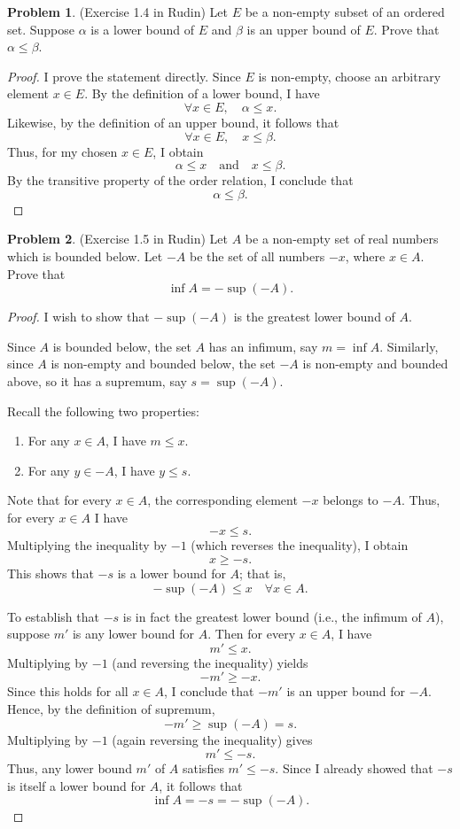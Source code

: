 \documentclass[12pt,oneside]{article}
\theoremstyle{definition}
\newtheorem{problem}{Problem}
\begin{document}
\newpage

\begin{problem}
(Exercise 1.4 in Rudin) 
Let $E$ be a non-empty subset of an ordered set. 
Suppose $\alpha$ is a lower bound of $E$ and $\beta$ is an upper bound of $E$. 
Prove that $\alpha \leq \beta$. 
\end{problem}

\begin{proof}
I prove the statement directly. Since \( E \) is non-empty, choose an arbitrary element \( x \in E \). By the definition of a lower bound, I have
\[
\forall x \in E, \quad \alpha \leq x.
\]
Likewise, by the definition of an upper bound, it follows that
\[
\forall x \in E, \quad x \leq \beta.
\]
Thus, for my chosen \( x \in E \), I obtain
\[
\alpha \leq x \quad \text{and} \quad x \leq \beta.
\]
By the transitive property of the order relation, I conclude that
\[
\alpha \leq \beta.
\]
\end{proof}

\newpage 

\begin{problem}
(Exercise 1.5 in Rudin)
Let $A$ be a non-empty set of real numbers which is bounded below. 
Let $-A$ be the set of all numbers $-x$, where $x\in A$. 
Prove that 
\[
\inf A = - \sup (-A).
\]
\end{problem}

\begin{proof}
I wish to show that \(-\sup(-A)\) is the greatest lower bound of \(A\).

Since \(A\) is bounded below, the set \(A\) has an infimum, say \(m = \inf A\). Similarly, since \(A\) is non-empty and bounded below, the set \(-A\) is non-empty and bounded above, so it has a supremum, say \(s = \sup(-A)\).

Recall the following two properties:
\begin{enumerate}
    \item For any \(x \in A\), I have \(m \le x\).
    \item For any \(y \in -A\), I have \(y \le s\).
\end{enumerate}

Note that for every \(x \in A\), the corresponding element \(-x\) belongs to \(-A\). Thus, for every \(x \in A\) I have
\[
-x \le s.
\]
Multiplying the inequality by \(-1\) (which reverses the inequality), I obtain
\[
x \ge -s.
\]
This shows that \(-s\) is a lower bound for \(A\); that is,
\[
- \sup(-A) \le x \quad \forall x \in A.
\]

To establish that \(-s\) is in fact the greatest lower bound (i.e., the infimum of \(A\)), suppose \(m'\) is any lower bound for \(A\). Then for every \(x \in A\), I have
\[
m' \le x.
\]
Multiplying by \(-1\) (and reversing the inequality) yields
\[
-m' \ge -x.
\]
Since this holds for all \(x \in A\), I conclude that \(-m'\) is an upper bound for \(-A\). Hence, by the definition of supremum,
\[
-m' \ge \sup(-A) = s.
\]
Multiplying by \(-1\) (again reversing the inequality) gives
\[
m' \le -s.
\]
Thus, any lower bound \(m'\) of \(A\) satisfies \(m' \le -s\). Since I already showed that \(-s\) is itself a lower bound for \(A\), it follows that
\[
\inf A = -s = -\sup(-A).
\]
\end{proof}
\end{document}
